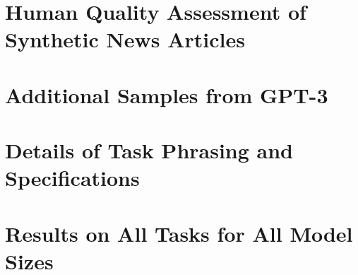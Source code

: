 \documentclass{article}
\begin{document}
\section{Human Quality Assessment of Synthetic News Articles}
\label{appendix:human_assessment}

\section{Additional Samples from GPT-3}
\label{appendix:additional_samples}

\clearpage
\newpage
\section{Details of Task Phrasing and Specifications}
\label{appendix:task_phrasing}

\clearpage
\newpage
\section{Results on All Tasks for All Model Sizes}
\label{appendix:results_on_all_tasks}


\clearpage
\newpage



\end{document}

